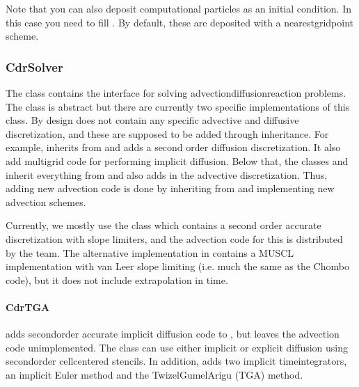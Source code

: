 \documentclass[letterpaper,10pt,english]{sphinxmanual}
\begin{document}
Note that you can also deposit computational particles as an initial condition.
In this case you need to fill .
By default, these are deposited with a nearest\sphinxhyphen{}grid\sphinxhyphen{}point scheme.


\subsubsection{CdrSolver}
\label{\detokenize{Solvers/CDR:cdrsolver}}
The  class contains the interface for solving advection\sphinxhyphen{}diffusion\sphinxhyphen{}reaction problems.
The class is abstract but there are currently two specific implementations of this class.
By design  does not contain any specific advective and diffusive discretization, and these are supposed to be added through inheritance.
For example,  inherits from  and adds a second order diffusion discretization.
It also add multigrid code for performing implicit diffusion.
Below that, the classes  and  inherit everything from  and also adds in the advective discretization.
Thus, adding new advection code is done by inheriting from  and implementing new advection schemes.

{\hfill{}\hspace*{\fill}}

Currently, we mostly use the  class which contains a second order accurate discretization with slope limiters, and the advection code for this is distributed by the  team.
The alternative implementation in  contains a MUSCL implementation with van Leer slope limiting (i.e. much the same as the Chombo code), but it does not include extrapolation in time.


\paragraph{CdrTGA}
\label{\detokenize{Solvers/CDR:cdrtga}}
 adds second\sphinxhyphen{}order accurate implicit diffusion code to , but leaves the advection code unimplemented.
The class can use either implicit or explicit diffusion using second\sphinxhyphen{}order cell\sphinxhyphen{}centered stencils.
In addition,  adds two implicit time\sphinxhyphen{}integrators, an implicit Euler method and the Twizel\sphinxhyphen{}Gumel\sphinxhyphen{}Arigu (TGA) method.
\end{document}
